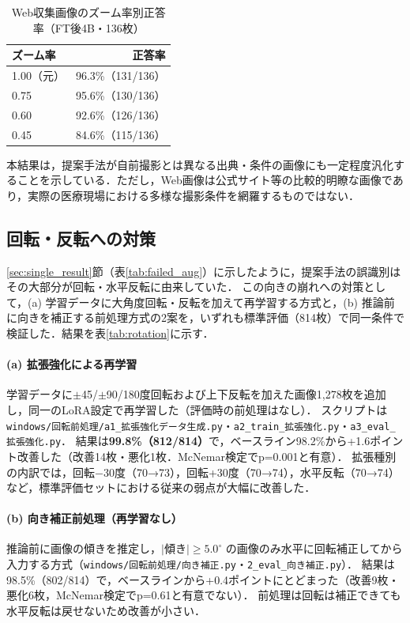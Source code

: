 \documentclass[dvipdfmx]{jsarticle}
\begin{document}
\begin{table}[htbp]
\centering
\caption{Web収集画像のズーム率別正答率（FT後4B・136枚）}
\label{tab:web_zoom}
\begin{tabular}{lr}
\hline
ズーム率 & 正答率 \\
\hline
1.00（元） & 96.3\%（131/136） \\
0.75 & 95.6\%（130/136） \\
0.60 & 92.6\%（126/136） \\
0.45 & 84.6\%（115/136） \\
\hline
\end{tabular}
\end{table}

本結果は，提案手法が自前撮影とは異なる出典・条件の画像にも一定程度汎化することを示している．ただし，Web画像は公式サイト等の比較的明瞭な画像であり，実際の医療現場における多様な撮影条件を網羅するものではない．

\subsection{回転・反転への対策}\label{sec:rotation}

\ref{sec:single_result}節（表\ref{tab:failed_aug}）に示したように，提案手法の誤識別はその大部分が回転・水平反転に由来していた．
この向きの崩れへの対策として，(a) 学習データに大角度回転・反転を加えて再学習する方式と，(b) 推論前に向きを補正する前処理方式の2案を，いずれも標準評価（814枚）で同一条件で検証した．結果を表\ref{tab:rotation}に示す．

\paragraph{(a) 拡張強化による再学習}
学習データに$\pm$45/$\pm$90/180度回転および上下反転を加えた画像1,278枚を追加し，同一のLoRA設定で再学習した（評価時の前処理はなし）．
スクリプトは\texttt{windows/回転前処理/a1\_拡張強化データ生成.py}・\texttt{a2\_train\_拡張強化.py}・\texttt{a3\_eval\_拡張強化.py}．
結果は\textbf{99.8\%（812/814）}で，ベースライン98.2\%から+1.6ポイント改善した（改善14枚・悪化1枚．McNemar検定でp=0.001と有意）．
拡張種別の内訳では，回転$-$30度（70→73），回転+30度（70→74），水平反転（70→74）など，標準評価セットにおける従来の弱点が大幅に改善した．

\paragraph{(b) 向き補正前処理（再学習なし）}
推論前に画像の傾きを推定し，$|$傾き$|\geq 5.0^\circ$ の画像のみ水平に回転補正してから入力する方式（\texttt{windows/回転前処理/向き補正.py}・\texttt{2\_eval\_向き補正.py}）．
結果は98.5\%（802/814）で，ベースラインから+0.4ポイントにとどまった（改善9枚・悪化6枚，McNemar検定でp=0.61と有意でない）．
前処理は回転は補正できても水平反転は戻せないため改善が小さい．
\end{document}
